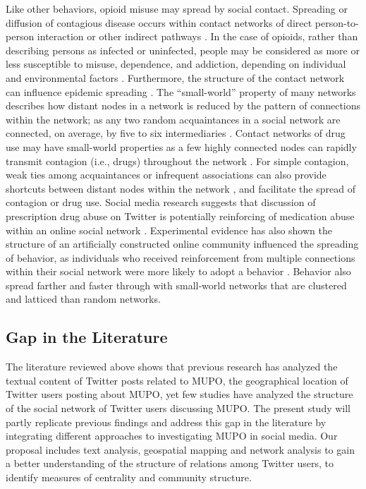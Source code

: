 \documentclass[sigconf]{acmart}
\begin{document}
Like other behaviors, opioid misuse may spread by social contact. Spreading 
or diffusion of contagious disease occurs within contact networks of direct 
person-to-person interaction or other indirect pathways \cite{pastor01}. In 
the case of opioids, rather than describing persons as infected or uninfected, 
people may be considered as more or less susceptible to misuse, dependence, and 
addiction, depending on individual and environmental factors \cite{volkow14}. 
Furthermore, the structure of the contact network can influence epidemic 
spreading \cite{watts98}. The “small-world” property of many networks describes 
how distant nodes in a network is reduced by the pattern of connections within 
the network; as any two random acquaintances in a social network are connected, 
on average, by five to six intermediaries \cite{tramil69}. Contact networks of 
drug use may have small-world properties as a few highly connected nodes can 
rapidly transmit contagion (i.e., drugs) throughout the network \cite{shaham03}. 
For simple contagion, weak ties among acquaintances or infrequent associations 
can also provide shortcuts between distant nodes within the network 
\cite{granovetter73}, and facilitate the spread of contagion or drug use. 
Social media research suggests that discussion of prescription drug abuse on 
Twitter is potentially reinforcing of medication abuse within an online social 
network \cite{hanson13}. Experimental evidence has also shown the structure of 
an artificially constructed online community influenced the spreading of 
behavior, as individuals who received reinforcement from multiple connections 
within their social network were more likely to adopt a behavior 
\cite{centola10}. Behavior also spread farther and faster through with 
small-world networks that are clustered and latticed than random networks.


\subsection{Gap in the Literature} 

The literature reviewed above shows that previous research has analyzed the 
textual content of Twitter posts related to MUPO, the geographical location of 
Twitter users posting about MUPO, yet few studies have analyzed the structure 
of the social network of Twitter users discussing MUPO. The present study will 
partly replicate previous findings and address this gap in the literature by 
integrating different approaches to investigating MUPO in social media. Our 
proposal includes text analysis, geospatial mapping and network analysis to 
gain a better understanding of the structure of relations among Twitter users, 
to identify measures of centrality and community structure. 
\end{document}
